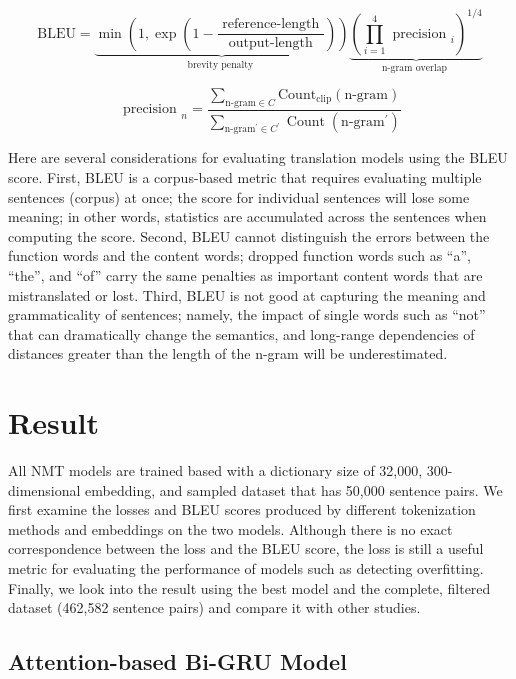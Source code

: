 \begin{equation}
    \mathrm{BLEU}=\underbrace{\min \left(1, \exp \left(1-\frac{\text { reference-length }}{\text { output-length }}\right)\right)}_{\text {brevity penalty }} \underbrace{\left(\prod_{i=1}^{4} \text { precision }_{i}\right)^{1 / 4}}_{\text {n-gram overlap }} \label{eq:eq16}
\end{equation}

\begin{equation}
    \text { precision }_{n} = \frac{\sum_{ \text {n-gram} \in C} \text {Count}_{\text {clip}}(\text {n-gram})}{\sum_{\text{n-gram}^{\prime} \in C^{\prime}} \operatorname{Count}\left(\text{n-gram}^{\prime}\right)} \label{eq:eq17}
\end{equation}

Here are several considerations for evaluating translation models using the BLEU score. First, BLEU is a corpus-based metric that requires evaluating multiple sentences (corpus) at once; the score for individual sentences will lose some meaning; in other words, statistics are accumulated across the sentences when computing the score. Second, BLEU cannot distinguish the errors between the function words and the content words; dropped function words such as ``a'', ``the'', and ``of'' carry the same penalties as important content words that are mistranslated or lost. Third, BLEU is not good at capturing the meaning and grammaticality of sentences; namely, the impact of single words such as ``not'' that can dramatically change the semantics, and long-range dependencies of distances greater than the length of the n-gram will be underestimated.

\section{Result} \label{sec:result}

All NMT models are trained based with a dictionary size of 32,000, 300-dimensional embedding, and sampled dataset that has 50,000 sentence pairs. We first examine the losses and BLEU scores produced by different tokenization methods and embeddings on the two models. Although there is no exact correspondence between the loss and the BLEU score, the loss is still a useful metric for evaluating the performance of models such as detecting overfitting. Finally, we look into the result using the best model and the complete, filtered dataset (462,582 sentence pairs) and compare it with other studies.

\subsection{Attention-based Bi-GRU Model}


